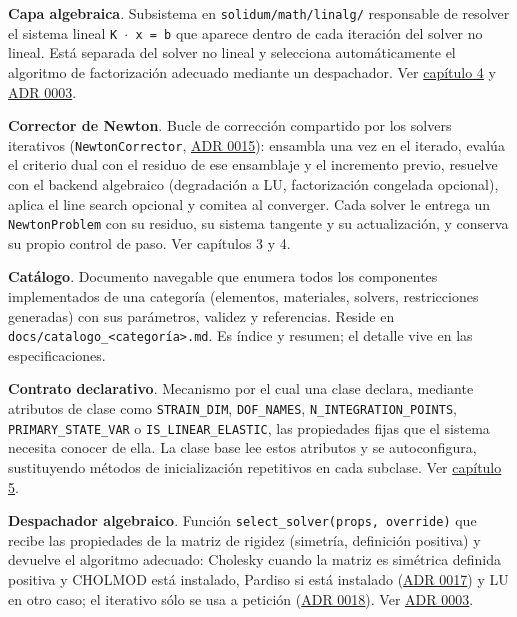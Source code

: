 \documentclass[11pt,oneside]{report}
\begin{document}
\textbf{Capa algebraica}. Subsistema en \texttt{solidum/\allowbreak{}math/\allowbreak{}linalg/\allowbreak{}} responsable de resolver el sistema lineal \texttt{K \ensuremath{\cdot} x = b} que aparece dentro de cada iteración del solver no lineal. Está separada del solver no lineal y selecciona automáticamente el algoritmo de factorización adecuado mediante un despachador. Ver \hyperref[cap:4]{capítulo 4} y \hyperref[adr:0003]{ADR 0003}.

\textbf{Corrector de Newton}. Bucle de corrección compartido por los solvers iterativos (\texttt{NewtonCorrector}, \hyperref[adr:0015]{ADR 0015}): ensambla una vez en el iterado, evalúa el criterio dual con el residuo de ese ensamblaje y el incremento previo, resuelve con el backend algebraico (degradación a LU, factorización congelada opcional), aplica el line search opcional y comitea al converger. Cada solver le entrega un \texttt{NewtonProblem} con su residuo, su sistema tangente y su actualización, y conserva su propio control de paso. Ver capítulos 3 y 4.

\textbf{Catálogo}. Documento navegable que enumera todos los componentes implementados de una categoría (elementos, materiales, solvers, restricciones generadas) con sus parámetros, validez y referencias. Reside en \texttt{docs/\allowbreak{}catalogo\_\allowbreak{}\textless{}categoría\textgreater{}.\allowbreak{}md}. Es índice y resumen; el detalle vive en las especificaciones.

\textbf{Contrato declarativo}. Mecanismo por el cual una clase declara, mediante atributos de clase como \texttt{STRAIN\_DIM}, \texttt{DOF\_NAMES}, \texttt{N\_\allowbreak{}INTEGRATION\_\allowbreak{}POINTS}, \texttt{PRIMARY\_\allowbreak{}STATE\_\allowbreak{}VAR} o \texttt{IS\_\allowbreak{}LINEAR\_\allowbreak{}ELASTIC}, las propiedades fijas que el sistema necesita conocer de ella. La clase base lee estos atributos y se autoconfigura, sustituyendo métodos de inicialización repetitivos en cada subclase. Ver \hyperref[cap:5]{capítulo 5}.

\textbf{Despachador algebraico}. Función \texttt{select\_\allowbreak{}solver(props, override)} que recibe las propiedades de la matriz de rigidez (simetría, definición positiva) y devuelve el algoritmo adecuado: Cholesky cuando la matriz es simétrica definida positiva y CHOLMOD está instalado, Pardiso si está instalado (\hyperref[adr:0017]{ADR 0017}) y LU en otro caso; el iterativo sólo se usa a petición (\hyperref[adr:0018]{ADR 0018}). Ver \hyperref[adr:0003]{ADR 0003}.
\end{document}
